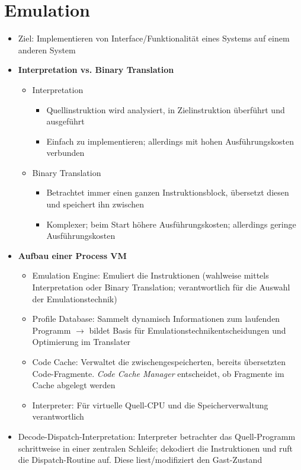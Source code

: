 \section{Emulation}
\begin{itemize}
	\item Ziel: Implementieren von Interface/Funktionalität eines Systems auf einem anderen System
	\item \textbf{Interpretation vs. Binary Translation}
	\begin{itemize}
		\item Interpretation
		\begin{itemize}
			\item Quellinstruktion wird analysiert, in Zielinstruktion überführt und ausgeführt
			\item Einfach zu implementieren; allerdings mit hohen Ausführungskosten verbunden
		\end{itemize}
		\item Binary Translation
		\begin{itemize}
			\item Betrachtet immer einen ganzen Instruktionsblock, übersetzt diesen und speichert ihn zwischen
			\item Komplexer; beim Start höhere Ausführungskosten; allerdings geringe Ausführungskosten
		\end{itemize}
	\end{itemize}
	\item \textbf{Aufbau einer Process VM}
	\begin{itemize}
		\item Emulation Engine: Emuliert die Instruktionen (wahlweise mittels Interpretation oder Binary Translation; verantwortlich für die Auswahl der Emulationstechnik)
		\item Profile Database: Sammelt dynamisch Informationen zum laufenden Programm \(\rightarrow\) bildet Basis für Emulationstechnikentscheidungen und Optimierung im Translater
		\item Code Cache: Verwaltet die zwischengespeicherten, bereits übersetzten Code-Fragmente. \textit{Code Cache Manager} entscheidet, ob Fragmente im Cache abgelegt werden
		\item Interpreter: Für virtuelle Quell-CPU und die Speicherverwaltung verantwortlich
	\end{itemize}
	\item Decode-Dispatch-Interpretation: Interpreter betrachter das Quell-Programm schrittweise in einer zentralen Schleife; dekodiert die Instruktionen und ruft die Dispatch-Routine auf. Diese liest/modifiziert den Gast-Zustand

\end{itemize}
